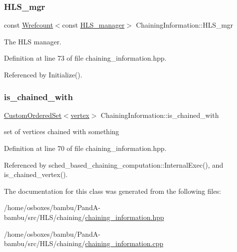 \subsubsection{\texorpdfstring{H\+L\+S\+\_\+mgr}{HLS\_mgr}}
{\footnotesize\ttfamily const \hyperlink{classWrefcount}{Wrefcount}$<$const \hyperlink{classHLS__manager}{H\+L\+S\+\_\+manager}$>$ Chaining\+Information\+::\+H\+L\+S\+\_\+mgr\hspace{0.3cm}{\ttfamily [protected]}}



The H\+LS manager. 



Definition at line 73 of file chaining\+\_\+information.\+hpp.



Referenced by Initialize().

\mbox{\label{classChainingInformation_a83d7fa1a525b444cee4f71b361c8d748}} 
\subsubsection{\texorpdfstring{is\+\_\+chained\+\_\+with}{is\_chained\_with}}
{\footnotesize\ttfamily \hyperlink{classCustomOrderedSet}{Custom\+Ordered\+Set}$<$\hyperlink{graph_8hpp_abefdcf0544e601805af44eca032cca14}{vertex}$>$ Chaining\+Information\+::is\+\_\+chained\+\_\+with\hspace{0.3cm}{\ttfamily [protected]}}



set of vertices chained with something 



Definition at line 70 of file chaining\+\_\+information.\+hpp.



Referenced by sched\+\_\+based\+\_\+chaining\+\_\+computation\+::\+Internal\+Exec(), and is\+\_\+chained\+\_\+vertex().



The documentation for this class was generated from the following files\+:\begin{DoxyCompactItemize}
\item 
/home/osboxes/bambu/\+Pand\+A-\/bambu/src/\+H\+L\+S/chaining/\hyperlink{chaining__information_8hpp}{chaining\+\_\+information.\+hpp}\item 
/home/osboxes/bambu/\+Pand\+A-\/bambu/src/\+H\+L\+S/chaining/\hyperlink{chaining__information_8cpp}{chaining\+\_\+information.\+cpp}\end{DoxyCompactItemize}
